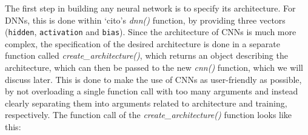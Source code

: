 \documentclass[12pt,twoside]{scrreport}
\newcommand{\pkg}[1]{`#1'}
\newcommand{\fn}[2][]{\textit{#2(}#1\textit{)}}
\newcommand{\val}[1]{\texttt{#1}}
\begin{document}
The first step in building any neural network is to specify its architecture. For DNNs, this is done within \pkg{cito}s \fn{dnn} function, by providing three vectors (\val{hidden}, \val{activation} and \val{bias}). Since the architecture of CNNs is much more complex, the specification of the desired architecture is done in a separate function called \fn{create\_architecture}, which returns an object describing the architecture, which can then be passed to the new \fn{cnn} function, which we will discuss later. This is done to make the use of CNNs as user-friendly as possible, by not overloading a single function call with too many arguments and instead clearly separating them into arguments related to architecture and training, respectively. The function call of the \fn{create\_architecture} function looks like this:
\end{document}
